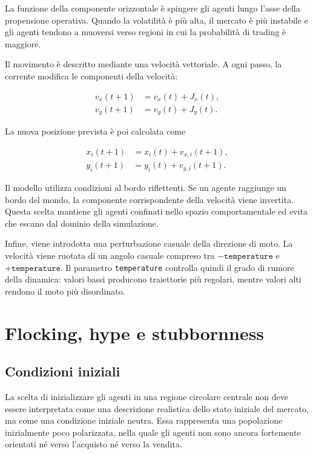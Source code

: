 La funzione della componente orizzontale è spingere gli agenti lungo l'asse della
propensione operativa. Quando la volatilità è più alta, il mercato è più
instabile e gli agenti tendono a muoversi verso regioni in cui la probabilità di
trading è maggiore.

Il movimento è descritto mediante una velocità vettoriale. A ogni passo, la
corrente modifica le componenti della velocità:

\begin{align}
    v_x(t+1) &= v_x(t) + J_x(t), \\
    v_y(t+1) &= v_y(t) + J_y(t).
\end{align}

La nuova posizione prevista è poi calcolata come

\begin{align}
    x_i(t+1) &= x_i(t) + v_{x,i}(t+1), \\
    y_i(t+1) &= y_i(t) + v_{y,i}(t+1).
\end{align}

Il modello utilizza condizioni al bordo riflettenti. Se un agente raggiunge un
bordo del mondo, la componente corrispondente della velocità viene invertita.
Questa scelta mantiene gli agenti confinati nello spazio comportamentale ed evita
che escano dal dominio della simulazione.

Infine, viene introdotta una perturbazione casuale della direzione di moto. La
velocità viene ruotata di un angolo casuale compreso tra
\(-\texttt{temperature}\) e \(+\texttt{temperature}\). Il parametro
\texttt{temperature} controlla quindi il grado di rumore della dinamica: valori
bassi producono traiettorie più regolari, mentre valori alti rendono il moto più
disordinato.

\section{Flocking, hype e stubbornness}

\subsection{Condizioni iniziali}
La scelta di inizializzare gli agenti in una regione circolare centrale non deve
essere interpretata come una descrizione realistica dello stato iniziale del
mercato, ma come una condizione iniziale neutra. Essa rappresenta una popolazione
inizialmente poco polarizzata, nella quale gli agenti non sono ancora fortemente
orientati né verso l'acquisto né verso la vendita.

